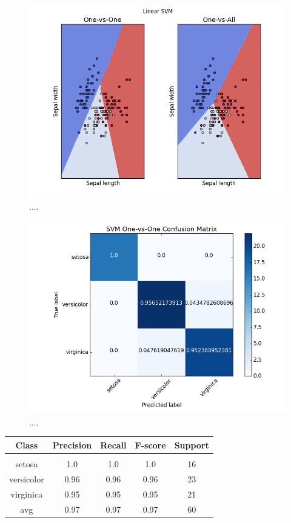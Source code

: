 \documentclass[11pt]{article}
\begin{document}
\begin{figure}[H]
\centering
\includegraphics{svm_linear_1v1_1va.png}
\caption{....}
\label{fig:q5svms}
\end{figure}
\begin{figure}[H]
\centering
\includegraphics{svm_linear_1v1_cm.png}
\caption{....}
\label{fig:q5_1v1}
\end{figure}
\begin{table}[ht]
\centering
\begin{tabular}{c | c c c c}
Class & Precision & Recall & F-score & Support\\
\hline
\hline\\
setosa & 1.0 & 1.0 & 1.0 & 16\\
versicolor & 0.96 & 0.96 & 0.96 & 23\\
virginica & 0.95 & 0.95 & 0.95 & 21\\
avg & 0.97 & 0.97 & 0.97 & 60\\
\end{tabular}
\end{table}
\end{document}
